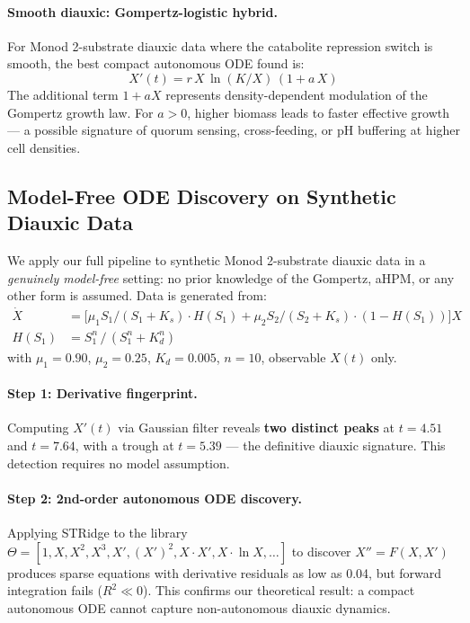 \documentclass[11pt,a4paper]{article}
\begin{document}
\paragraph{Smooth diauxic: Gompertz-logistic hybrid.}
For Monod 2-substrate diauxic data where the catabolite repression switch is smooth,
the best compact autonomous ODE found is:
\begin{equation}
  X'(t) = r\, X\, \ln(K/X)\,(1 + a\,X)
  \label{eq:gomp_logistic}
\end{equation}
The additional term $1 + aX$ represents density-dependent modulation of the Gompertz
growth law. For $a > 0$, higher biomass leads to faster effective growth — a possible
signature of quorum sensing, cross-feeding, or pH buffering at higher cell densities.

\subsection{Model-Free ODE Discovery on Synthetic Diauxic Data}
\label{sec:modelfree_diauxic}

We apply our full pipeline to synthetic Monod 2-substrate diauxic data in a \emph{genuinely
model-free} setting: no prior knowledge of the Gompertz, aHPM, or any other form is assumed.
Data is generated from:
\begin{align}
  \dot{X}  &= \bigl[\mu_1 S_1/(S_1+K_s) \cdot H(S_1) + \mu_2 S_2/(S_2+K_s) \cdot (1-H(S_1))\bigr] X \\
  H(S_1)   &= S_1^n\,/\,(S_1^n + K_d^n)
\end{align}
with $\mu_1=0.90$, $\mu_2=0.25$, $K_d=0.005$, $n=10$, observable $X(t)$ only.

\paragraph{Step 1: Derivative fingerprint.}
Computing $X'(t)$ via Gaussian filter reveals \textbf{two distinct peaks} at $t=4.51$ and
$t=7.64$, with a trough at $t=5.39$ — the definitive diauxic signature. This detection
requires no model assumption.

\paragraph{Step 2: 2nd-order autonomous ODE discovery.}
Applying STRidge to the library $\Theta = [1, X, X^2, X^3, X', (X')^2, X{\cdot}X',
X{\cdot}\ln X, \ldots]$ to discover $X'' = F(X, X')$ produces sparse equations with
derivative residuals as low as 0.04, but forward integration fails ($R^2 \ll 0$).
This confirms our theoretical result: a compact autonomous ODE cannot capture
non-autonomous diauxic dynamics.
\end{document}
